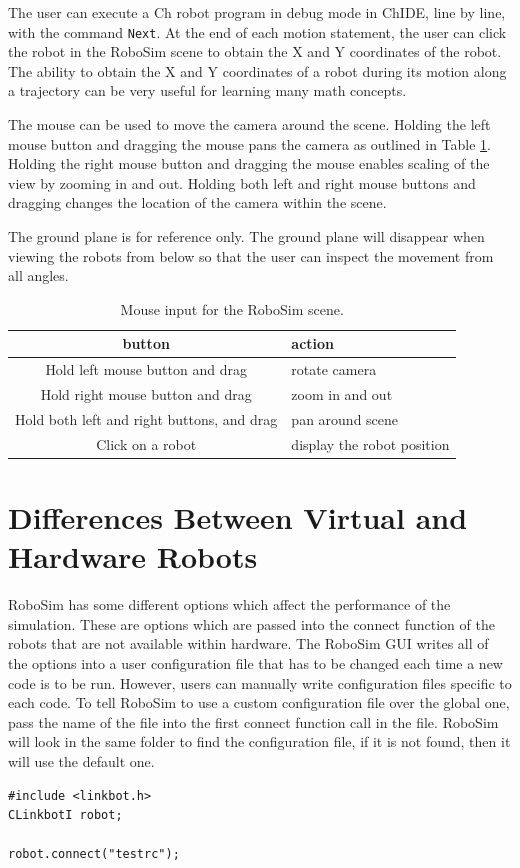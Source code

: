 \documentclass{article}
\begin{document}
The user can execute a Ch robot program in debug mode in ChIDE, line by line,
with the command {\tt Next}. At the end of each motion statement, the user can
click the robot in the RoboSim scene to obtain the X and Y coordinates of the
robot.  The ability to obtain the X and Y coordinates of a robot during its
motion along a trajectory can be very useful for learning many math concepts.

The mouse can be used to move the camera around the scene.  Holding the left
mouse button and dragging the mouse pans the camera as outlined in Table
\ref{tab:buttons}.  Holding the right mouse button and dragging the mouse
enables scaling of the view by zooming in and out.  Holding both left and right
mouse buttons and dragging changes the location of the camera within the scene.

The ground plane is for reference only.  The ground plane will disappear when
viewing the robots from below so that the user can inspect the movement from all
angles.

\begin{table}[H]
	\begin{center}
	\begin{tabular}{c | l }
		\hline \hline
		\textbf{button} & \textbf{action} \\ \hline
		Hold left mouse button and drag& rotate camera \\
		Hold right mouse button and drag& zoom in and out \\
		Hold both left and right buttons,  and drag & pan around scene \\
		Click on a robot & display the robot position\\
		\hline \hline
	\end{tabular}
	\caption{Mouse input for the RoboSim scene.}
	\label{tab:buttons}
	\end{center}
\end{table}

%
%
\section{Differences Between Virtual and Hardware Robots}
RoboSim has some different options which affect the performance of the
simulation.  These are options which are passed into the connect function of the
robots that are not available within hardware.  The RoboSim GUI writes all of
the options into a user configuration file that has to be changed each time a
new code is to be run.  However, users can manually write configuration files
specific to each code.  To tell RoboSim to use a custom configuration file over
the global one, pass the name of the file into the first connect function call
in the file.  RoboSim will look in the same folder to find the configuration
file, if it is not found, then it will use the default one.
\begin{verbatim}
#include <linkbot.h>
CLinkbotI robot;

robot.connect("testrc");
\end{verbatim}
\end{document}
